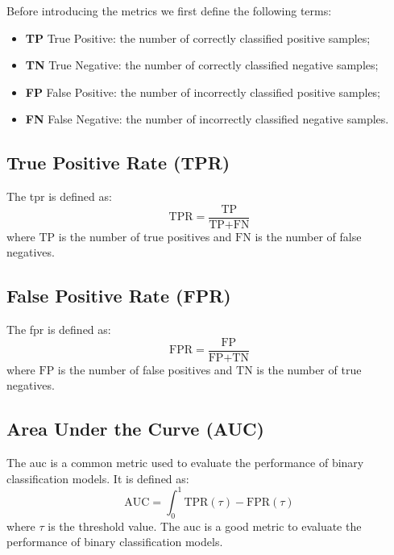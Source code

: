     Before introducing the metrics we first define the following terms:
    \begin{itemize}
        \item \textbf{TP} True Positive: the number of correctly classified positive samples;
        \item \textbf{TN} True Negative: the number of correctly classified negative samples;
        \item \textbf{FP} False Positive: the number of incorrectly classified positive samples;
        \item \textbf{FN} False Negative: the number of incorrectly classified negative samples.
    \end{itemize}

    \subsection{True Positive Rate (TPR)}
    The \acrfull{tpr} is defined as:
    \begin{equation}
        \text{TPR} = \frac{\text{TP}}{\text{TP} + \text{FN}}
    \end{equation}
    where $\text{TP}$ is the number of true positives and $\text{FN}$ is the number of false negatives.

    \subsection{False Positive Rate (FPR)}
    The \acrfull{fpr} is defined as:
    \begin{equation}
        \text{FPR} = \frac{\text{FP}}{\text{FP} + \text{TN}}
    \end{equation}
    where $\text{FP}$ is the number of false positives and $\text{TN}$ is the number of true negatives.

    \subsection{Area Under the Curve (AUC)}
    The \acrfull{auc} is a common metric used to evaluate the performance of binary classification models. It is defined as:
    \begin{equation}
        \text{AUC} = \int_0^1 \text{TPR}(\tau) - \text{FPR}(\tau) 
        \label{eq:auc}
    \end{equation}
    where $\tau$ is the threshold value. The \acrshort{auc} is a good metric to evaluate the performance of binary classification models.
    

